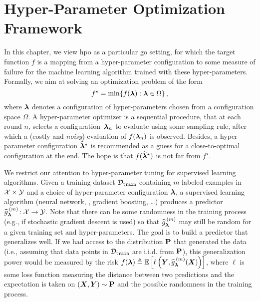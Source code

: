 \section{Hyper-Parameter Optimization Framework}\label{sec:dttts.framework}

In this chapter, we view \gls{hpo} as a particular \gls{go} setting, for which the target function $f$ is a mapping from a hyper-parameter configuration to some measure of failure for the machine learning algorithm trained with these hyper-parameters. Formally, we aim at solving an optimization problem of the form 
\[
f^\star = \min \{f({\boldsymbol \lambda}):{\boldsymbol \lambda}\in\Omega\}\,,
\]
where ${\boldsymbol \lambda}$ denotes a configuration of hyper-parameters chosen from a configuration space $\Omega$. A hyper-parameter optimizer is a sequential procedure, that at each round $n$, selects a configuration~${\boldsymbol \lambda}_n$ to evaluate using some sampling rule, after which a (costly and \emph{noisy}) evaluation of $f({\boldsymbol \lambda}_n)$ is observed. Besides, a hyper-parameter configuration $\widehat{{\boldsymbol \lambda}}^\star$ is recommended as a guess for a close-to-optimal configuration at the end. The hope is that $f(\widehat{{\boldsymbol \lambda}}^\star)$ is not far from $f^\star$.

We restrict our attention to hyper-parameter tuning for supervised learning algorithms. Given a training dataset $\mathcal{D}_{\texttt{train}}$ containing $m$ labeled examples in $\mathcal{X} \times \mathcal{Y}$ and a choice of hyper-parameter configuration ${\boldsymbol \lambda}$, a supervised learning algorithm (neural network, \SVM, gradient boosting, \dots) produces a predictor $\widehat{g}_{\bm\lambda}^{\,(m)}\!:\mathcal{X} \rightarrow \mathcal{Y}$. Note that there can be some randomness in the training process (e.g., if stochastic gradient descent is used) so that $\widehat{g}_{{\boldsymbol \lambda}}^{\,(m)}$ may still be random for a given training set and hyper-parameters. The goal is to build a predictor that generalizes well. If we had access to the distribution ${\bf P}$ that generated the data (i.e., assuming that data points in $\mathcal{D}_{\texttt{train}}$ are i.i.d. from ${\bf P}$), this generalization power would be measured by the risk $f(\bm\lambda) \triangleq \mathbb{E}\left[\ell\left(\bm Y,\widehat g_{{\boldsymbol \lambda}}^{\,(m)}(\bm X)\right) \right]$, where $\ell$ is some loss function measuring the distance between two predictions and the expectation is taken on $(\bm X , \bm Y) \sim {\bf P}$ and the possible randomness in the training process. 


